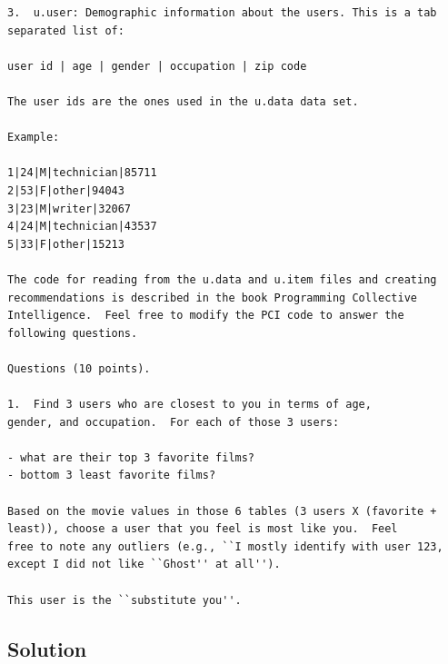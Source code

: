 \begin{verbatim}
3.  u.user: Demographic information about the users. This is a tab
separated list of:

user id | age | gender | occupation | zip code

The user ids are the ones used in the u.data data set.

Example:

1|24|M|technician|85711 
2|53|F|other|94043 
3|23|M|writer|32067 
4|24|M|technician|43537 
5|33|F|other|15213

The code for reading from the u.data and u.item files and creating
recommendations is described in the book Programming Collective
Intelligence.  Feel free to modify the PCI code to answer the 
following questions.

Questions (10 points).

1.  Find 3 users who are closest to you in terms of age, 
gender, and occupation.  For each of those 3 users:

- what are their top 3 favorite films?
- bottom 3 least favorite films?

Based on the movie values in those 6 tables (3 users X (favorite +
least)), choose a user that you feel is most like you.  Feel 
free to note any outliers (e.g., ``I mostly identify with user 123,
except I did not like ``Ghost'' at all'').  

This user is the ``substitute you''.  
\end{verbatim}

\subsection{Solution}

